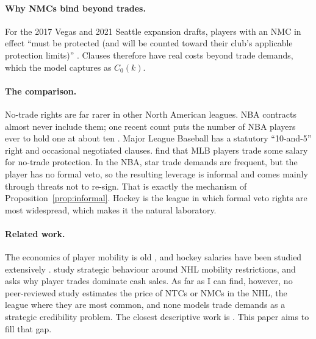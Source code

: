 \paragraph{Why NMCs bind beyond trades.} For the 2017 Vegas and 2021 Seattle expansion drafts, players with an NMC in effect ``must be protected (and will be counted toward their club's applicable protection limits)'' \citep{nhl_expansion_rules}. Clauses therefore have real costs beyond trade demands, which the model captures as $C_0(k)$.

\paragraph{The comparison.} No-trade rights are far rarer in other North American leagues. NBA contracts almost never include them; one recent count puts the number of NBA players ever to hold one at about ten \citep{gerstle2025}. Major League Baseball has a statutory ``10-and-5'' right and occasional negotiated clauses. \citet{pedacehall2012} find that MLB players trade some salary for no-trade protection. In the NBA, star trade demands are frequent, but the player has no formal veto, so the resulting leverage is informal and comes mainly through threats not to re-sign. That is exactly the mechanism of Proposition~\ref{prop:informal}. Hockey is the league in which formal veto rights are most widespread, which makes it the natural laboratory.

\paragraph{Related work.} The economics of player mobility is old \citep{rottenberg1956,kahn2000,fortquirk1995}, and hockey salaries have been studied extensively \citep{idsonkahane2000,cyrenne2013,kahane2024}. \citet{fumarco2024} study strategic behaviour around NHL mobility restrictions, and \citet{marburger2009} asks why player trades dominate cash sales. As far as I can find, however, no peer-reviewed study estimates the price of NTCs or NMCs in the NHL, the league where they are most common, and none models trade demands as a strategic credibility problem. The closest descriptive work is \citet{hockeygraphs2021}. This paper aims to fill that gap.
